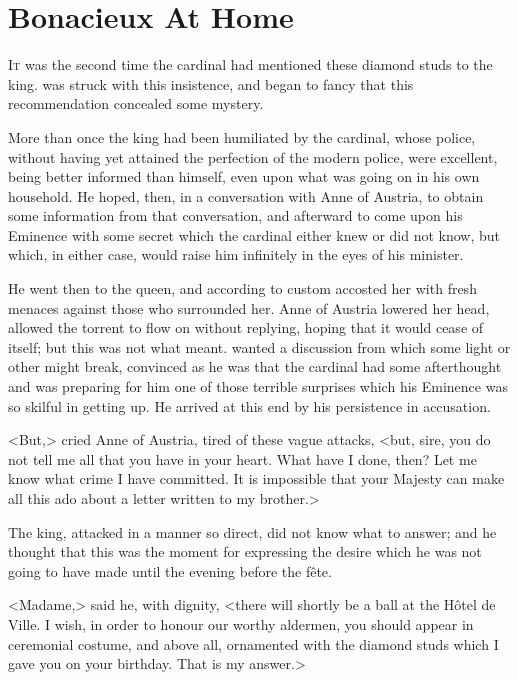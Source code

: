 
\chapter{Bonacieux At Home}

\lettrine{I}{t} was the second time the cardinal had mentioned these diamond studs to the king.  was struck with this insistence, and began to fancy that this recommendation concealed some mystery. 

\zz
More than once the king had been humiliated by the cardinal, whose police, without having yet attained the perfection of the modern police, were excellent, being better informed than himself, even upon what was going on in his own household. He hoped, then, in a conversation with Anne of Austria, to obtain some information from that conversation, and afterward to come upon his Eminence with some secret which the cardinal either knew or did not know, but which, in either case, would raise him infinitely in the eyes of his minister. 

He went then to the queen, and according to custom accosted her with fresh menaces against those who surrounded her. Anne of Austria lowered her head, allowed the torrent to flow on without replying, hoping that it would cease of itself; but this was not what  meant.  wanted a discussion from which some light or other might break, convinced as he was that the cardinal had some afterthought and was preparing for him one of those terrible surprises which his Eminence was so skilful in getting up. He arrived at this end by his persistence in accusation. 

<But,> cried Anne of Austria, tired of these vague attacks, <but, sire, you do not tell me all that you have in your heart. What have I done, then? Let me know what crime I have committed. It is impossible that your Majesty can make all this ado about a letter written to my brother.> 

The king, attacked in a manner so direct, did not know what to answer; and he thought that this was the moment for expressing the desire which he was not going to have made until the evening before the fête. 

<Madame,> said he, with dignity, <there will shortly be a ball at the Hôtel de Ville. I wish, in order to honour our worthy aldermen, you should appear in ceremonial costume, and above all, ornamented with the diamond studs which I gave you on your birthday. That is my answer.> 

